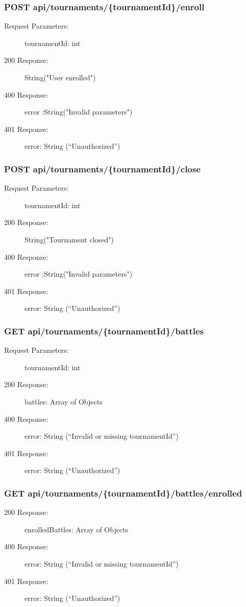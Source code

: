 \documentclass{Configuration_Files/Template}
\begin{document}
\subsubsection{POST api/tournaments/\{tournamentId\}/enroll}
\begin{description}
    \item[Request Parameters:] tournamentId: int
    \item[200 Response:] String("User enrolled")
    \item[400 Response:] error :String("Invalid parameters")
    \item[401 Response:] error: String (“Unauthorized”)
\end{description}

\subsubsection{POST api/tournaments/\{tournamentId\}/close}
\begin{description}
    \item[Request Parameters:] tournamentId: int
    \item[200 Response:] String("Tournament closed")
    \item[400 Response:] error :String("Invalid parameters")
    \item[401 Response:] error: String (“Unauthorized”)
\end{description}

\subsubsection{GET api/tournaments/\{tournamentId\}/battles}
\begin{description}
    \item[Request Parameters:] tournamentId: int
    \item[200 Response:] battles: Array of Objects
    \item[400 Response:] error: String (“Invalid or missing tournamentId”)
    \item[401 Response:] error: String (“Unauthorized”)
\end{description}

\subsubsection{GET api/tournaments/\{tournamentId\}/battles/enrolled}
\begin{description}
    \item[200 Response:] enrolledBattles: Array of Objects
    \item[400 Response:] error: String (“Invalid or missing tournamentId”)
    \item[401 Response:] error: String (“Unauthorized”)
\end{description}
\end{document}
